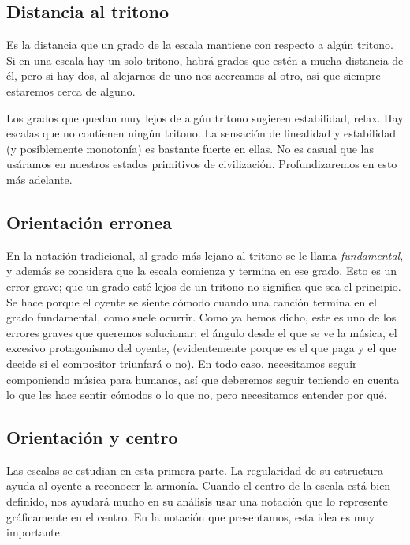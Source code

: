 \documentclass[]{report}
\begin{document}
\subsection{Distancia al tritono}

Es la distancia que un grado de la escala mantiene con respecto a algún tritono. Si en una escala hay un solo tritono, habrá grados que estén a mucha distancia de él, pero si hay dos, al alejarnos de uno nos acercamos al otro, así que siempre estaremos cerca de alguno.

Los grados que quedan muy lejos de algún tritono sugieren estabilidad, relax. Hay escalas que no contienen ningún tritono. La sensación de linealidad y estabilidad (y posiblemente monotonía) es bastante fuerte en ellas. No es casual que las usáramos en nuestros estados primitivos de civilización. Profundizaremos en esto más adelante.

\subsection{Orientación erronea}

En la notación tradicional, al grado más lejano al tritono se le llama \emph{fundamental}, y además se considera que la escala comienza y termina en ese grado. Esto es un error grave; que un grado esté lejos de un tritono no significa que sea el principio. Se hace porque el oyente se siente cómodo cuando una canción termina en el grado fundamental, como suele ocurrir. Como ya hemos dicho, este es uno de los errores graves que queremos solucionar: el ángulo desde el que se ve la música, el excesivo protagonismo del oyente, (evidentemente porque es el que paga y el que decide si el compositor triunfará o no). En todo caso, necesitamos seguir componiendo música para humanos, así que deberemos seguir teniendo en cuenta lo que les hace sentir cómodos o lo que no, pero necesitamos entender por qué.

\subsection{Orientación y centro}

Las escalas se estudian en esta primera parte. La regularidad de su estructura
ayuda al oyente a reconocer la armonía. Cuando el
centro de la escala está bien definido, nos ayudará mucho en su análisis usar
una notación que lo represente gráficamente en el centro. En la notación que
presentamos, esta idea es muy importante.
\end{document}
